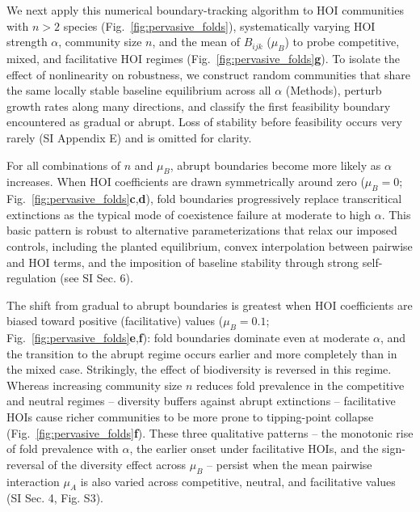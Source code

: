 \documentclass[
 reprint,
 amsmath,
 amssymb,
 aps,
 superscriptaddress,
]{revtex4-2}
\begin{document}
We next apply this numerical boundary-tracking algorithm to HOI communities with $n > 2$ species (Fig.~\ref{fig:pervasive_folds}), systematically varying HOI strength $\alpha$, community size $n$, and the mean of $B_{ijk}$ ($\mu_B$) to probe competitive, mixed, and facilitative HOI regimes (Fig.~\ref{fig:pervasive_folds}\textbf{g}). To isolate the effect of nonlinearity on robustness, we construct random communities that share the same locally stable baseline equilibrium across all $\alpha$ (Methods), perturb growth rates along many directions, and classify the first feasibility boundary encountered as gradual or abrupt. Loss of stability before feasibility occurs very rarely (SI Appendix E) and is omitted for clarity.

For all combinations of $n$ and $\mu_B$, abrupt boundaries become more likely as $\alpha$ increases. When HOI coefficients are drawn symmetrically around zero ($\mu_B = 0$; Fig.~\ref{fig:pervasive_folds}\textbf{c},\textbf{d}), fold boundaries progressively replace transcritical extinctions as the typical mode of coexistence failure at moderate to high $\alpha$. This basic pattern is robust to alternative parameterizations that relax our imposed controls, including the planted equilibrium, convex interpolation between pairwise and HOI terms, and the imposition of baseline stability through strong self-regulation (see SI Sec. 6).

The shift from gradual to abrupt boundaries is greatest when HOI coefficients are biased toward positive (facilitative) values ($\mu_B = 0.1$; Fig.~\ref{fig:pervasive_folds}\textbf{e},\textbf{f}): fold boundaries dominate even at moderate $\alpha$, and the transition to the abrupt regime occurs earlier and more completely than in the mixed case. Strikingly, the effect of biodiversity is reversed in this regime. Whereas increasing community size $n$ reduces fold prevalence in the competitive and neutral regimes -- diversity buffers against abrupt extinctions -- facilitative HOIs cause richer communities to be more prone to tipping-point collapse (Fig.~\ref{fig:pervasive_folds}\textbf{f}). These three qualitative patterns -- the monotonic rise of fold prevalence with $\alpha$, the earlier onset under facilitative HOIs, and the sign-reversal of the diversity effect across $\mu_B$ -- persist when the mean pairwise interaction $\mu_A$ is also varied across competitive, neutral, and facilitative values (SI Sec. 4, Fig. S3).
\end{document}
